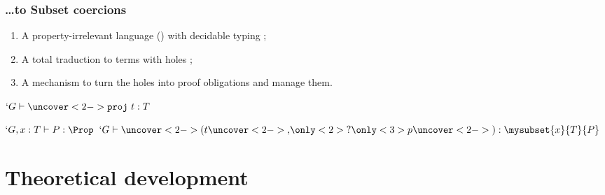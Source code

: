 \begin{frame}[t]
  \frametitle{\ldots to Subset coercions}
  
  \begin{enumerate}
  \item<1-> A property-irrelevant language (\lng{}) with \alert{decidable} typing ;
  \item<2-> A total traduction to \Coq{} terms with holes ;
  \item<3-> A mechanism to turn the holes into proof obligations and
    manage them.
  \end{enumerate}
  
  \begin{center}
    {$`G \typea \uncover<2->{\texttt{proj}~}t : T$}
    {}\DP

    \vspace{0.5cm}
    {$`G, x : T \type P : \Prop$}
    {}
    {$`G \type \uncover<2->{(}t\uncover<2->{, }\only<2>{?}\only<3>{p}\uncover<2->{)} : \mysubset{x}{T}{P}$}
    {}\DP
  \end{center}
  

\end{frame}

\section{Theoretical development}

\subsection{\lng{}}

